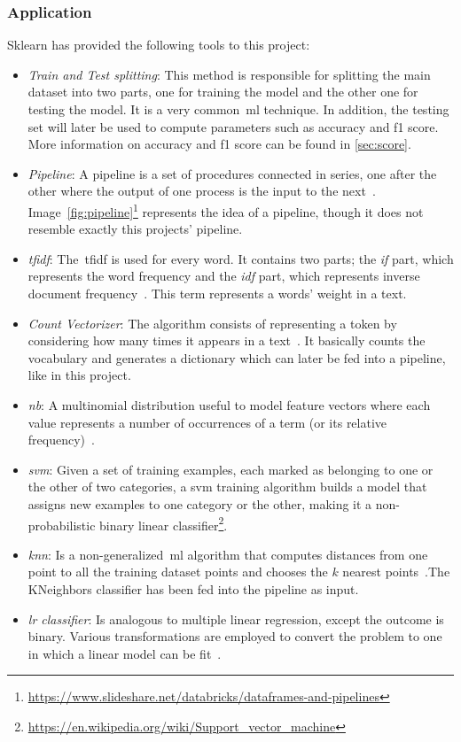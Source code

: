 \subsubsection{Application}
Sklearn has provided the following tools to this project:
\begin{itemize}
	\item \textit{Train and Test splitting}: This method is responsible for splitting the main dataset into two parts, one for training the model and the other one for testing the model. It is a very common~\ac{ml} technique. In addition, the testing set will later be used to compute parameters such as accuracy and f1 score. More information on accuracy and f1 score can be found in \cref{sec:score}.
	\item \textit{Pipeline}: A pipeline is a set of procedures connected in series, one after the other where the output of one process is the input to the next~\cite{pipeline1}. Image~\ref{fig:pipeline}\footnote{\url{https://www.slideshare.net/databricks/dataframes-and-pipelines}} represents the idea of a pipeline, though it does not resemble exactly this projects' pipeline.
	\item \textit{\acl{tfidf}}: The~\acf{tfidf} is used for every word. It contains two parts; the \textit{if} part, which represents the word frequency and the \textit{idf} part, which represents inverse document frequency~\cite{tfidf1}. This term represents a words' weight in a text.
	\item \textit{Count Vectorizer}: The algorithm consists of representing a token by considering how many times it appears in a text~\cite{countvect1}. It basically counts the vocabulary and generates a dictionary which can later be fed into a pipeline, like in this project.
	\item \textit{\acl{nb}}: A multinomial distribution useful to model feature vectors where each value represents a number of occurrences of a term (or its relative frequency)~\cite{countvect1}.
	\item \textit{\acl{svm}}: Given a set of training examples, each marked as belonging to one or the other of two categories, a \acf{svm} training algorithm builds a model that assigns new examples to one category or the other, making it a non-probabilistic binary linear classifier\footnote{\url{https://en.wikipedia.org/wiki/Support_vector_machine}}.
	\item \textit{\acl{knn}}: Is a non-generalized~\ac{ml} algorithm that computes distances from one point to all the training dataset points and chooses the $k$ nearest points~\cite{knn1}.The KNeighbors classifier has been  fed into the pipeline as input.
	\item \textit{\acl{lr} classifier}: Is analogous to multiple linear regression, except the outcome is binary. Various transformations are employed to convert the problem to one in which a linear model can be fit~\cite{lr1}.
\end{itemize}

